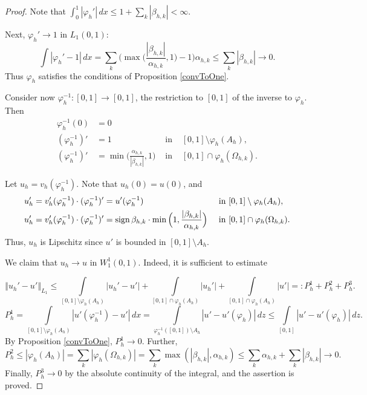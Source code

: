 \documentclass[12pt]{article}
\newcommand{\norm}[1]{\left\Vert#1\right\Vert}
\newcommand{\abs}[1]{\left\vert#1\right\vert}
\renewcommand{\phi}{\varphi}
\renewcommand{\le}{\leqslant}
\newcommand{\W}{W_1^1}
\newcommand{\sign}{\mathop{\rm sign}\nolimits}
\begin{document}
\begin{proof}
Note that $\int_0^1 \abs{\phi_h'} \, dx \le 1 + \sum_k \abs{\beta_{h,k}} < \infty$.

Next, $\phi_h' \to 1$ in $L_1(0, 1)$:
$$\int \abs{\phi_h' - 1} \, dx = \sum\limits_k \Big( \max \Big( \frac{\abs{\beta_{h,k}}}{\alpha_{h,k}}, 1 \Big) - 1 \Big) \alpha_{h,k} \le
\sum\limits_k \abs{\beta_{h,k}} \to 0.$$
Thus $\phi_h$ satisfies the conditions of Proposition \ref{convToOne}.

Consider now $\phi_h^{-1}: [0, 1] \to [0, 1]$, the restriction to $[0, 1]$ of the inverse to $\phi_h$.
Then
$$
\begin{aligned}
\phi_h^{-1} ( 0 ) &= 0 & & \\
( \phi_h^{-1} )' &=  1 & \text{ in } & [0, 1] \setminus \phi_h( A_h ),\\
( \phi_h^{-1} )' &=  \min \Big( \frac{ \alpha_{h,k} }{ \abs{ \beta_{h,k} } }, 1 \Big) & \text{ in } & [0, 1] \cap \phi_h( \Omega_{h,k} ).
\end{aligned}
$$

Let $u_h = v_h( \phi_h^{-1} )$.
Note that $u_h(0) = u(0)$, and
\begin{align*}
u_h' &=  v_h'( \phi_h^{-1} ) \cdot ( \phi_h^{-1} )' = u'( \phi_h^{-1} ) & \text{ in } & [0, 1] \setminus \phi_h( A_h ),\\
u_h' &=  v_h'( \phi_h^{-1} ) \cdot ( \phi_h^{-1} )' = 
\sign{ \beta_{h,k} } \cdot \min \Big( 1, \frac{ \abs{ \beta_{h,k} } }{ \alpha_{h,k} } \Big) & \text{ in } & [0, 1] \cap \phi_h( \Omega_{h,k} ).
\end{align*}
Thus, $u_h$ is Lipschitz since $u'$ is bounded in $[0, 1] \setminus A_h$.

We claim that $u_h \to u$ in $\W(0, 1)$. Indeed, it is sufficient to estimate

$$\norm{u_h' - u'}_{L_1} \le \int\limits_{[0, 1] \setminus \phi_h(A_h)} \abs{u_h' - u'} + 
\int\limits_{[0, 1] \cap \phi_h(A_h)} \abs{u_h'} + \int\limits_{[0, 1] \cap \phi_h(A_h)} \abs{u'} =: P_h^1 + P_h^2 + P_h^3.$$
$$P_h^1 = \int\limits_{[0, 1] \setminus \phi_h( A_h )} \abs{u'( \phi_h^{-1} ) - u'} \, dx =
\int\limits_{\phi_h^{-1} ( [0, 1] ) \setminus A_h} \abs{u' - u'( \phi_h )} \, dz \le
\int\limits_{[0, 1]} \abs{u' - u'( \phi_h )} \, dz.$$
By Proposition \ref{convToOne}, $P_h^1 \to 0$.
Further,
$$P_h^2 \le \abs{\phi_h( A_h )} = \sum\limits_k \abs{\phi_h( \Omega_{h,k} )} = \sum\limits_k \max (\abs{\beta_{h,k}}, \alpha_{h,k})
\le \sum\limits_k \alpha_{h,k} + \sum\limits_k \abs{\beta_{h,k}} \to 0.$$
Finally, $P_h^3 \to 0$ by the absolute continuity of the integral, and the assertion is proved.


\end{proof}
\end{document}
